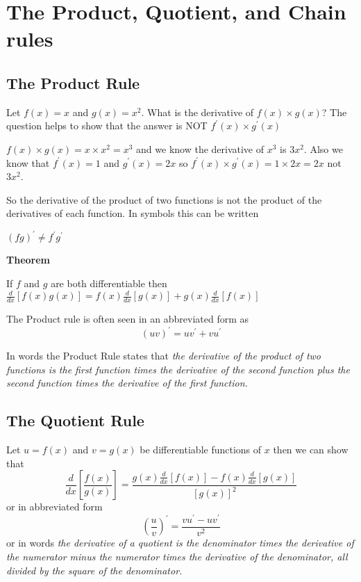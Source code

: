 \section{The Product, Quotient, and Chain rules}

\subsection{The Product Rule}
Let $f (x) =x$ and $g (x) =x^{2}$. What is the derivative of $f (x) \times g (x)$? The question helps to show that the answer is NOT $f^{ \prime } (x) \times g^{ \prime } (x)$ 

$f (x) \times g (x) =x \times x^{2} =x^{3}$ and we know the derivative of $x^{3}$ is $3 x^{2}$. Also we know that $f^{ \prime } (x) =1$ and $g^{ \prime } (x) =2 x$ so $f^{ \prime } (x) \times g^{ \prime } (x) =1 \times 2 x =2 x$ not $3 x^{2}$. 

So the derivative of the product of two functions is not the product of the derivatives of each function. In symbols this can be written 

\begin{center}
$\left (f g\right )^{ \prime } \neq f^{ \prime } g^{ \prime }$
\end{center}\par
\textbf{Theorem} 

If $f$ and $g$ are both differentiable then $\frac{d}{d x} \left [f (x) g (x)\right ] =f (x) \frac{d}{d x} \left [g (x)\right ] +g (x) \frac{d}{d x} \left [f (x)\right ]$ 



The Product rule is often seen in an abbreviated form as
\begin{equation*}\left (u v\right )^{ \prime } =u v^{ \prime } +v u^{ \prime }
\end{equation*}

In words the Product Rule states that \textit{the derivative of the product of two functions is the first function times the derivative of the second function plus the second function times the derivative of the first function.} 



\subsection{The Quotient Rule}
Let $u =f (x)$ and $v =g (x)$ be differentiable functions of $x$ then we can show that
\begin{equation*}\frac{d}{d x} \genfrac{[}{]}{}{}{f (x)}{g (x)} =\frac{g (x) \frac{d}{d x} \left [f (x)\right ] -f (x) \frac{d}{d x} \left [g (x)\right ]}{\left [g (x)\right ]^{2}}
\end{equation*}or in abbreviated form
\begin{equation*}\genfrac{(}{)}{}{}{u}{v}^{ \prime } =\frac{v u^{ \prime } -u v^{ \prime }}{v^{2}}
\end{equation*}or in words \textit{the derivative of a quotient is the denominator times the derivative of the numerator minus the numerator times the derivative of the denominator, all divided by the square of the denominator.}


